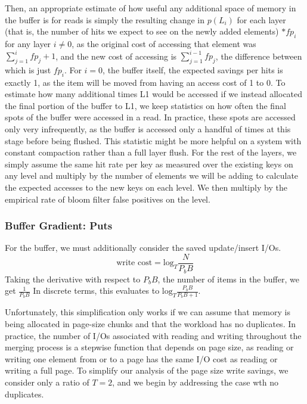 \documentclass{cidr-2019}
\begin{document}
Then, an appropriate estimate of how useful any additional space of memory in
the buffer is for reads is simply the resulting change in $p(L_i)$ for each layer (that is, the number of hits
we expect to see on the newly added elements) $* fp_{i}$ for any layer $i\neq0$, as the original cost of accessing that element was $\sum_{j=1}^i fp_{j} + 1$, and the new cost of accessing is $\sum_{j=1}^{i-1} fp_{j} $, the difference between which is just $fp_{i}$. For $i=0$, the buffer itself, the expected savings per hits is exactly 1, as the item will be moved from having an access cost of 1 to 0. To estimate how many additional times L1 would be accessed if
we instead allocated the final portion of the buffer to L1, we keep
statistics on how often the final spots of the buffer were accessed in a
read. In practice, these spots are accessed only very infrequently, as the
buffer is accessed only a handful of times at this stage before being flushed.
This statistic might be more helpful on a system with constant compaction
rather than a full layer flush. For the rest of the layers, we simply assume the same hit rate per key
as measured over the existing keys on any level and multiply by the number of elements we will be adding to calculate
the expected accesses to the new keys on each level. We then multiply by the empirical rate of bloom filter false positives on the level.

\subsubsection{Buffer Gradient: Puts}

For the buffer, we must additionally consider the saved update/insert I/Os.  $$
\text{write cost} = \textrm{log}_{T} \frac{N}{P_bB} $$ Taking the derivative with
respect to $P_bB$, the number of items in the buffer, we get $\frac{1}{P_bB}$ In
discrete terms, this evaluates to $\textrm{log}_{T} \frac{P_bB}{P_bB+1}$. 

Unfortunately, this simplification only works if we can assume that memory is being allocated in 
page-size chunks and that the workload has no duplicates. In practice, the number of I/Os associated
with reading and writing throughout the merging process is a stepwise function that depends on page size, as reading or
writing one element from or to a page has the same I/O cost as reading or writing a full page. To simplify our analysis
of the page size write savings, we consider only a ratio of $T=2$, and we begin by addressing the case wth no 
duplicates. 
\end{document}
